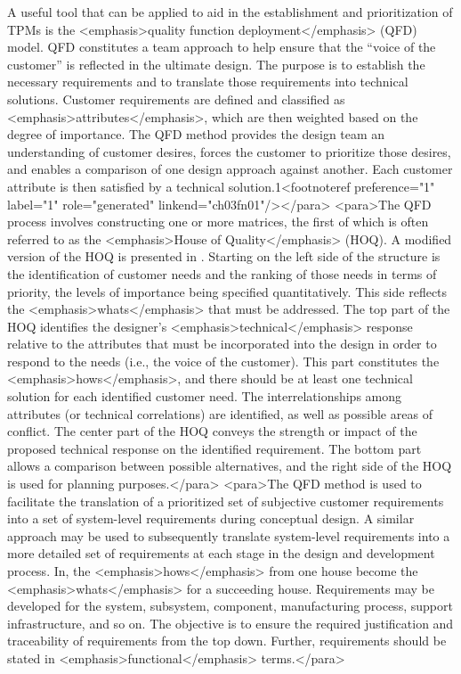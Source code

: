 A useful tool that can be applied to aid in the establishment and prioritization of TPMs is the <emphasis>quality function deployment</emphasis> (QFD) model. QFD constitutes a team approach to help ensure that the “voice of the customer” is reflected in the ultimate design. The purpose is to establish the necessary requirements and to translate those requirements into technical solutions. Customer requirements are defined and classified as <emphasis>attributes</emphasis>, which are then weighted based on the degree of importance. The QFD method provides the design team an understanding of customer desires, forces the customer to prioritize those desires, and enables a comparison of one design approach against another. Each customer attribute is then satisfied by a technical solution.1<footnoteref preference="1" label="1" role="generated" linkend="ch03fn01"/></para>
<para>The QFD process involves constructing one or more matrices, the first of which is often referred to as the <emphasis>House of Quality</emphasis> (HOQ). A modified version of the HOQ is presented in . Starting on the left side of the structure is the identification of customer needs and the ranking of those needs in terms of priority, the levels of importance being specified quantitatively. This side reflects the <emphasis>whats</emphasis> that must be addressed. The top part of the HOQ identifies the designer’s <emphasis>technical</emphasis> response relative to the attributes that must be incorporated into the design in order to respond to the needs (i.e., the voice of the customer). This part constitutes the <emphasis>hows</emphasis>, and there should be at least one technical solution for each identified customer need. The interrelationships among attributes (or technical correlations) are identified, as well as possible areas of conflict. The center part of the HOQ conveys the strength or impact of the proposed technical response on the identified requirement. The bottom part allows a comparison between possible alternatives, and the right side of the HOQ is used for planning purposes.</para>
<para>The QFD method is used to facilitate the translation of a prioritized set of subjective customer requirements into a set of system-level requirements during conceptual design. A similar approach may be used to subsequently translate system-level requirements into a more detailed set of requirements at each stage in the design and development process. In, the <emphasis>hows</emphasis> from one house become the <emphasis>whats</emphasis> for a succeeding house. Requirements may be developed for the system, subsystem, component, manufacturing process, support infrastructure, and so on. The objective is to ensure the required justification and traceability of requirements from the top down. Further, requirements should be stated in <emphasis>functional</emphasis> terms.</para>
